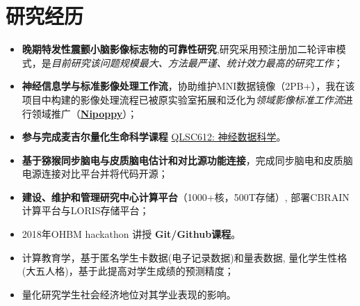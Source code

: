 \documentclass{resume}
\begin{document}
\section{研究经历}
\begin{itemize}
  \item \textbf{晚期特发性震颤小脑影像标志物的可靠性研究},研究采用预注册加二轮评审模式，是\emph{目前研究该问题规模最大、方法最严谨、统计效力最高的研究工作}；
  \item \textbf{神经信息学与标准影像处理工作流}，协助维护MNI数据镜像（2PB+），我在该项目中构建的影像处理流程已被原实验室拓展和泛化为\emph{领域影像标准工作流}进行领域推广（\href{https://github.com/neurodatascience/nipoppy}{\bf{Nipoppy}}）； 
  \item \textbf{参与完成麦吉尔量化生命科学课程} \href{https://neurodatascience.github.io/QLS612-Overview/}{QLSC612: 神经数据科学}。
\end{itemize}

\begin{itemize}
  \item \textbf{基于猕猴同步脑电与皮质脑电估计和对比源功能连接}，完成同步脑电和皮质脑电源连接对比平台并将代码开源；
  \item \textbf{建设、维护和管理研究中心计算平台}（1000+核，500T存储）, 部署CBRAIN计算平台与LORIS存储平台； 
  \item 2018年OHBM hackathon 讲授 \textbf{Git/Github课程}。
\end{itemize}

\begin{itemize}
  \item 计算教育学，基于匿名学生卡数据(电子记录数据)和量表数据, 量化学生性格(大五人格)，基于此提高对学生成绩的预测精度；
  \item 量化研究学生社会经济地位对其学业表现的影响。
\end{itemize}
\end{document}
